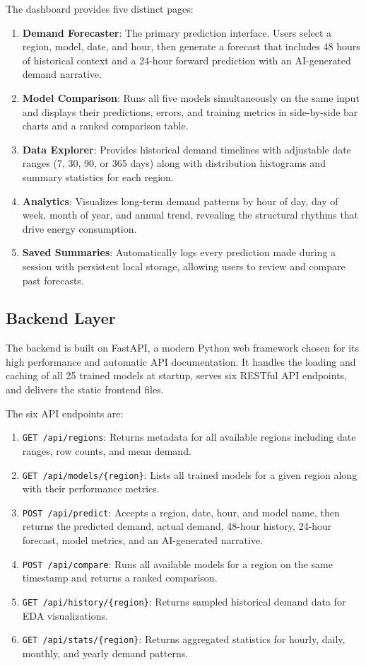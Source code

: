 \documentclass[conference]{IEEEtran}
\begin{document}
\medskip
\noindent The dashboard provides five distinct pages:
\begin{enumerate}
    \item \textbf{Demand Forecaster}: The primary prediction interface. Users select a region, model, date, and hour, then generate a forecast that includes 48 hours of historical context and a 24-hour forward prediction with an AI-generated demand narrative.
    \item \textbf{Model Comparison}: Runs all five models simultaneously on the same input and displays their predictions, errors, and training metrics in side-by-side bar charts and a ranked comparison table.
    \item \textbf{Data Explorer}: Provides historical demand timelines with adjustable date ranges (7, 30, 90, or 365 days) along with distribution histograms and summary statistics for each region.
    \item \textbf{Analytics}: Visualizes long-term demand patterns by hour of day, day of week, month of year, and annual trend, revealing the structural rhythms that drive energy consumption.
    \item \textbf{Saved Summaries}: Automatically logs every prediction made during a session with persistent local storage, allowing users to review and compare past forecasts.
\end{enumerate}

\subsection{Backend Layer}

The backend is built on FastAPI, a modern Python web framework chosen for its high performance and automatic API documentation. It handles the loading and caching of all 25 trained models at startup, serves six RESTful API endpoints, and delivers the static frontend files.

\medskip
\noindent The six API endpoints are:
\begin{enumerate}
    \item \texttt{GET /api/regions}: Returns metadata for all available regions including date ranges, row counts, and mean demand.
    \item \texttt{GET /api/models/\{region\}}: Lists all trained models for a given region along with their performance metrics.
    \item \texttt{POST /api/predict}: Accepts a region, date, hour, and model name, then returns the predicted demand, actual demand, 48-hour history, 24-hour forecast, model metrics, and an AI-generated narrative.
    \item \texttt{POST /api/compare}: Runs all available models for a region on the same timestamp and returns a ranked comparison.
    \item \texttt{GET /api/history/\{region\}}: Returns sampled historical demand data for EDA visualizations.
    \item \texttt{GET /api/stats/\{region\}}: Returns aggregated statistics for hourly, daily, monthly, and yearly demand patterns.
\end{enumerate}
\end{document}
